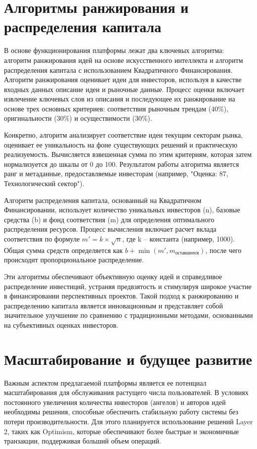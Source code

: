 \documentclass[
    candidate, %
    subf, %
]{disser}
\begin{document}
\section{Алгоритмы ранжирования и распределения капитала}

В основе функционирования платформы лежат два ключевых алгоритма: алгоритм ранжирования идей на основе искусственного интеллекта и алгоритм распределения капитала с использованием Квадратичного Финансирования. Алгоритм ранжирования оценивает идеи для инвесторов, используя в качестве входных данных описание идеи и рыночные данные. Процесс оценки включает извлечение ключевых слов из описания и последующее их ранжирование на основе трех основных критериев: соответствия рыночным трендам (40\%), оригинальности (30\%) и осуществимости (30\%).

Конкретно, алгоритм анализирует соответствие идеи текущим секторам рынка, оценивает ее уникальность на фоне существующих решений и практическую реализуемость. Вычисляется взвешенная сумма по этим критериям, которая затем нормализуется до шкалы от 0 до 100. Результатом работы алгоритма является ранг и метаданные, предоставляемые инвесторам (например, "Оценка: 87, Технологический сектор").

Алгоритм распределения капитала, основанный на Квадратичном Финансировании, использует количество уникальных инвесторов (n), базовые средства (b) и фонд соответствия (m) для определения оптимального распределения ресурсов. Процесс вычисления включает расчет вклада соответствия по формуле $m' = k \times \sqrt{n}$, где k – константа (например, 1000). Общая сумма средств определяется как $b + \min(m', m_{оставшееся})$, после чего происходит пропорциональное распределение.

Эти алгоритмы обеспечивают объективную оценку идей и справедливое распределение инвестиций, устраняя предвзятость и стимулируя широкое участие в финансировании перспективных проектов. Такой подход к ранжированию и распределению капитала является инновационным и представляет собой значительное улучшение по сравнению с традиционными методами, основанными на субъективных оценках инвесторов.

\section{Масштабирование и будущее развитие}

Важным аспектом предлагаемой платформы является ее потенциал масштабирования для обслуживания растущего числа пользователей. В условиях постоянного увеличения количества инвесторов (ангелов) и авторов идей необходимы решения, способные обеспечить стабильную работу системы без потери производительности. Для этого планируется использование решений Layer 2, таких как Optimism, которые обеспечивают более быстрые и экономичные транзакции, поддерживая больший объем операций.
\end{document}
